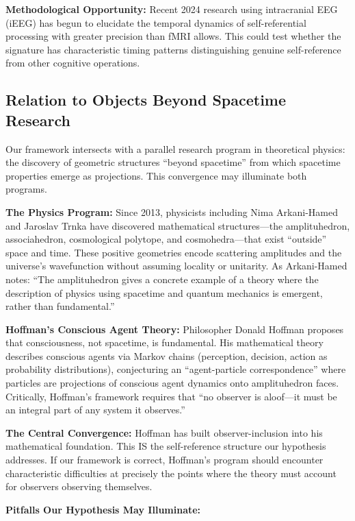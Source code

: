 \documentclass[12pt,a4paper]{article}
\begin{document}
\textbf{Methodological Opportunity:} Recent 2024 research using intracranial EEG (iEEG) has begun to elucidate the temporal dynamics of self-referential processing with greater precision than fMRI allows. This could test whether the signature has characteristic timing patterns distinguishing genuine self-reference from other cognitive operations.

\subsection{Relation to Objects Beyond Spacetime Research}

Our framework intersects with a parallel research program in theoretical physics: the discovery of geometric structures ``beyond spacetime'' from which spacetime properties emerge as projections. This convergence may illuminate both programs.

\textbf{The Physics Program:} Since 2013, physicists including Nima Arkani-Hamed and Jaroslav Trnka have discovered mathematical structures---the amplituhedron, associahedron, cosmological polytope, and cosmohedra---that exist ``outside'' space and time. These positive geometries encode scattering amplitudes and the universe's wavefunction without assuming locality or unitarity. As Arkani-Hamed notes: ``The amplituhedron gives a concrete example of a theory where the description of physics using spacetime and quantum mechanics is emergent, rather than fundamental.''

\textbf{Hoffman's Conscious Agent Theory:} Philosopher Donald Hoffman proposes that consciousness, not spacetime, is fundamental. His mathematical theory describes conscious agents via Markov chains (perception, decision, action as probability distributions), conjecturing an ``agent-particle correspondence'' where particles are projections of conscious agent dynamics onto amplituhedron faces. Critically, Hoffman's framework requires that ``no observer is aloof---it must be an integral part of any system it observes.''

\textbf{The Central Convergence:} Hoffman has built observer-inclusion into his mathematical foundation. This IS the self-reference structure our hypothesis addresses. If our framework is correct, Hoffman's program should encounter characteristic difficulties at precisely the points where the theory must account for observers observing themselves.

\textbf{Pitfalls Our Hypothesis May Illuminate:}
\end{document}
